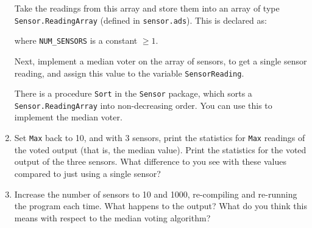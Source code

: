 \documentclass{article}
\begin{document}
\begin{enumerate}
 Take the readings from this array and store them into an array of type {\tt Sensor.ReadingArray} (defined in {\tt sensor.ads}). This is declared as:

\quad{}

\noindent 
where {\tt NUM\_SENSORS} is a constant \(\geq 1\).

Next, implement a median voter on the array of sensors, to get a single sensor reading, and assign this value to the variable \texttt{SensorReading}.

There is a procedure {\tt Sort} in the {\tt Sensor} package, which sorts a {\tt Sensor.ReadingArray} into non-decreasing order. You can use this to implement the median voter.

\item Set \texttt{Max} back to 10, and with 3 sensors, print the statistics for \texttt{Max} readings of the voted output (that is, the median value). Print the statistics for the voted output of the three sensors. What difference to you see with these values compared to just using a single sensor?

 \item Increase the number of sensors to 10 and 1000, re-compiling and re-running the program each time. What happens to the output? What do you think this means with respect to the median voting algorithm?

\end{enumerate}
\end{document}
